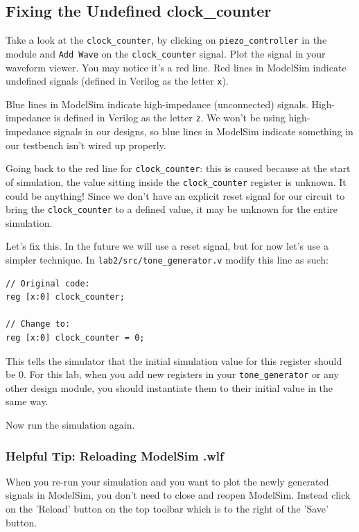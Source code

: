 \documentclass[11pt]{article}
\begin{document}
\subsection{Fixing the Undefined clock\_counter}

Take a look at the \verb|clock_counter|, by clicking on \verb|piezo_controller| in the module and \verb|Add Wave| on the \verb|clock_counter| signal. Plot the signal in your waveform viewer. You may notice it's a red line. Red lines in ModelSim indicate undefined signals (defined in Verilog as the letter \verb|x|).

Blue lines in ModelSim indicate high-impedance (unconnected) signals. High-impedance is defined in Verilog as the letter \verb|z|. We won't be using high-impedance signals in our designs, so blue lines in ModelSim indicate something in our testbench isn't wired up properly.

Going back to the red line for \verb|clock_counter|: this is caused because at the start of simulation, the value sitting inside the \verb|clock_counter| register is unknown. It could be anything! Since we don't have an explicit reset signal for our circuit to bring the \verb|clock_counter| to a defined value, it may be unknown for the entire simulation.

Let's fix this. In the future we will use a reset signal, but for now let's use a simpler technique. In \verb|lab2/src/tone_generator.v| modify this line as such:

\begin{verbatim}
// Original code:
reg [x:0] clock_counter;

// Change to:
reg [x:0] clock_counter = 0;
\end{verbatim}

This tells the simulator that the initial simulation value for this register should be 0. For this lab, when you add new registers in your \verb|tone_generator| or any other design module, you should instantiate them to their initial value in the same way.

Now run the simulation again.

\subsubsection{Helpful Tip: Reloading ModelSim .wlf}

When you re-run your simulation and you want to plot the newly generated signals in ModelSim, you don't need to close and reopen ModelSim. Instead click on the 'Reload' button on the top toolbar which is to the right of the 'Save' button.
\end{document}
